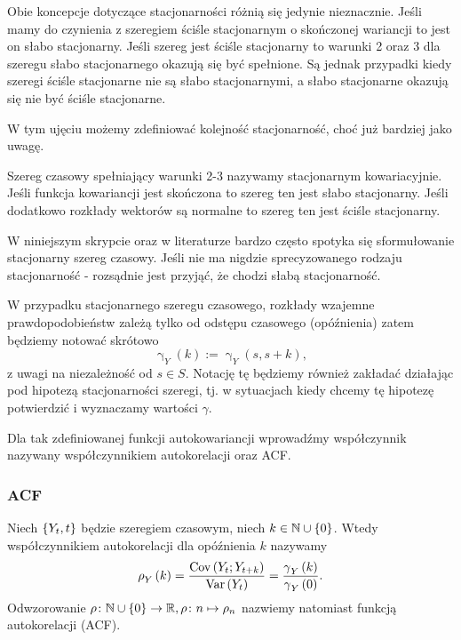 \documentclass[10pt,a4paper]{book}
\newcommand{\tsAutoCovariance}[3][\gamma]{\operatorname{#1}_{#2} \left({#3}\right)}
\newcommand{\tsAutoCorellation}[3][\rho]{\operatorname{#1}_{#2} \left({#3}\right)}
\begin{document}
Obie koncepcje dotyczące stacjonarności różnią się jedynie nieznacznie. Jeśli mamy do czynienia z szeregiem ściśle stacjonarnym o skończonej wariancji to jest on słabo stacjonarny. Jeśli szereg jest ściśle stacjonarny to warunki 2 oraz 3 dla szeregu słabo stacjonarnego okazują się być spełnione. Są jednak przypadki kiedy szeregi ściśle stacjonarne nie są słabo stacjonarnymi, a słabo stacjonarne okazują się nie być ściśle stacjonarne.

W tym ujęciu możemy zdefiniować kolejność stacjonarność, choć już bardziej jako uwagę.

\begin{remark}
Szereg czasowy spełniający warunki 2-3 nazywamy stacjonarnym kowariacyjnie. Jeśli funkcja kowariancji jest skończona to szereg ten jest słabo stacjonarny. Jeśli dodatkowo rozkłady wektorów są normalne to szereg ten jest ściśle stacjonarny.
\end{remark}

\begin{remark}
W niniejszym skrypcie oraz w literaturze bardzo często spotyka się sformułowanie stacjonarny szereg czasowy. Jeśli nie ma nigdzie sprecyzowanego rodzaju stacjonarność - rozsądnie jest przyjąć, że chodzi słabą stacjonarność.
\end{remark}

\begin{remark}
W przypadku stacjonarnego szeregu czasowego, rozkłady wzajemne prawdopodobieństw zależą tylko od odstępu czasowego (opóźnienia) zatem będziemy notować skrótowo 
$$
\tsAutoCovariance{Y}{k} := \tsAutoCovariance{Y}{s,s+k},
$$
z uwagi na niezależność od $s \in S$. Notację tę będziemy również zakładać działając pod hipotezą stacjonarności szeregi, tj. w sytuacjach kiedy chcemy tę hipotezę potwierdzić i wyznaczamy wartości $\gamma$.
\end{remark}

Dla tak zdefiniowanej funkcji autokowariancji wprowadźmy współczynnik nazywany współczynnikiem autokorelacji oraz ACF.

\subsubsection{ACF}

\begin{definition}
Niech $\left\lbrace {{Y_t}, {t}} \right\rbrace$ będzie szeregiem czasowym, niech $k \in \mathbb{N} \cup \left\lbrace {0} \right\rbrace $. Wtedy współczynnikiem autokorelacji dla opóźnienia $k$ nazywamy
$$
\tsAutoCorellation{Y}{k}= \frac{\Covariance{Y_t}{Y_{t+k}}}{\Variance{Y_t}} = \frac{\tsAutoCovariance{Y}{k} }{\tsAutoCovariance{Y}{0}}.
$$
Odwzorowanie $\rho\colon \mathbb{N} \cup \left\lbrace {0} \right\rbrace \to \mathbb{R},  \rho \colon n \mapsto \rho_n$ nazwiemy natomiast funkcją autokorelacji (ACF).
\end{definition}
\end{document}
